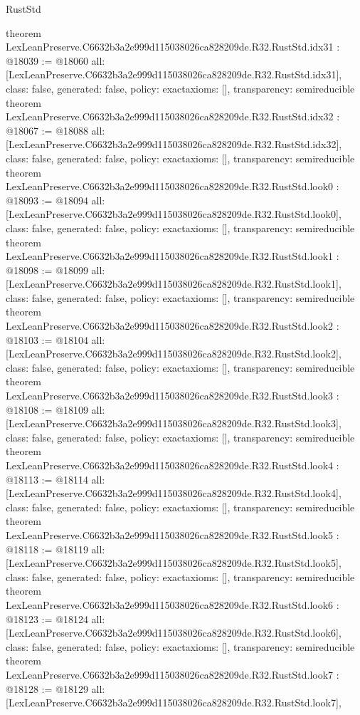 \begin{lexlean}{RustStd}
\begin{coremodule}
{}
theorem LexLeanPreserve.C6632b3a2e999d115038026ca828209de.R32.RustStd.idx31 : @18039 := @18060 {
  all: [LexLeanPreserve.C6632b3a2e999d115038026ca828209de.R32.RustStd.idx31],
  class: false,
  generated: false,
  policy: exact{axioms: []},
  transparency: semireducible
}
theorem LexLeanPreserve.C6632b3a2e999d115038026ca828209de.R32.RustStd.idx32 : @18067 := @18088 {
  all: [LexLeanPreserve.C6632b3a2e999d115038026ca828209de.R32.RustStd.idx32],
  class: false,
  generated: false,
  policy: exact{axioms: []},
  transparency: semireducible
}
theorem LexLeanPreserve.C6632b3a2e999d115038026ca828209de.R32.RustStd.look0 : @18093 := @18094 {
  all: [LexLeanPreserve.C6632b3a2e999d115038026ca828209de.R32.RustStd.look0],
  class: false,
  generated: false,
  policy: exact{axioms: []},
  transparency: semireducible
}
theorem LexLeanPreserve.C6632b3a2e999d115038026ca828209de.R32.RustStd.look1 : @18098 := @18099 {
  all: [LexLeanPreserve.C6632b3a2e999d115038026ca828209de.R32.RustStd.look1],
  class: false,
  generated: false,
  policy: exact{axioms: []},
  transparency: semireducible
}
theorem LexLeanPreserve.C6632b3a2e999d115038026ca828209de.R32.RustStd.look2 : @18103 := @18104 {
  all: [LexLeanPreserve.C6632b3a2e999d115038026ca828209de.R32.RustStd.look2],
  class: false,
  generated: false,
  policy: exact{axioms: []},
  transparency: semireducible
}
theorem LexLeanPreserve.C6632b3a2e999d115038026ca828209de.R32.RustStd.look3 : @18108 := @18109 {
  all: [LexLeanPreserve.C6632b3a2e999d115038026ca828209de.R32.RustStd.look3],
  class: false,
  generated: false,
  policy: exact{axioms: []},
  transparency: semireducible
}
theorem LexLeanPreserve.C6632b3a2e999d115038026ca828209de.R32.RustStd.look4 : @18113 := @18114 {
  all: [LexLeanPreserve.C6632b3a2e999d115038026ca828209de.R32.RustStd.look4],
  class: false,
  generated: false,
  policy: exact{axioms: []},
  transparency: semireducible
}
theorem LexLeanPreserve.C6632b3a2e999d115038026ca828209de.R32.RustStd.look5 : @18118 := @18119 {
  all: [LexLeanPreserve.C6632b3a2e999d115038026ca828209de.R32.RustStd.look5],
  class: false,
  generated: false,
  policy: exact{axioms: []},
  transparency: semireducible
}
theorem LexLeanPreserve.C6632b3a2e999d115038026ca828209de.R32.RustStd.look6 : @18123 := @18124 {
  all: [LexLeanPreserve.C6632b3a2e999d115038026ca828209de.R32.RustStd.look6],
  class: false,
  generated: false,
  policy: exact{axioms: []},
  transparency: semireducible
}
theorem LexLeanPreserve.C6632b3a2e999d115038026ca828209de.R32.RustStd.look7 : @18128 := @18129 {
  all: [LexLeanPreserve.C6632b3a2e999d115038026ca828209de.R32.RustStd.look7],
}
\end{coremodule}
\end{lexlean}
